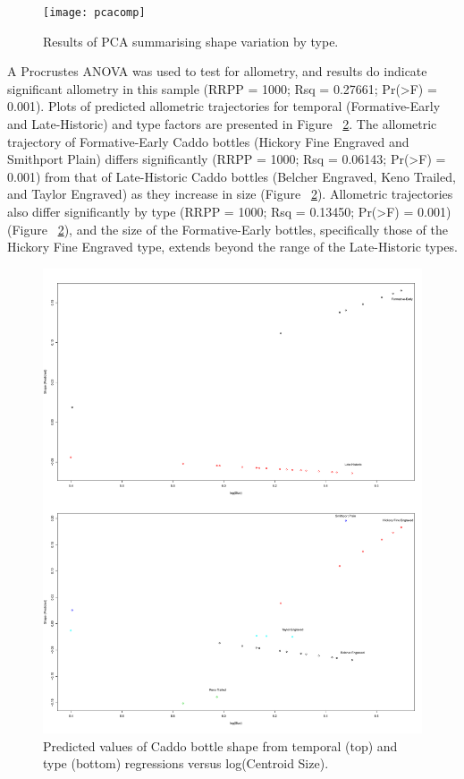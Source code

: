 \documentclass[review]{elsarticle}
\begin{document}
\begin{figure}[htbp]\centering
\texttt{[image: pcacomp]}
\caption{Results of PCA summarising shape variation by type.}
\label{fig:FigPCA}
\end{figure}

A Procrustes ANOVA was used to test for allometry, and results do indicate significant allometry in this sample (RRPP = 1000; Rsq = 0.27661; Pr(>F) = 0.001). Plots of predicted allometric trajectories for temporal (Formative-Early and Late-Historic) and type factors are presented in Figure ~\ref{fig:FigAllometry}. The allometric trajectory of Formative-Early Caddo bottles (Hickory Fine Engraved and Smithport Plain) differs significantly (RRPP = 1000; Rsq = 0.06143; Pr(>F) = 0.001) from that of Late-Historic Caddo bottles (Belcher Engraved, Keno Trailed, and Taylor Engraved) as they increase in size (Figure ~\ref{fig:FigAllometry}). Allometric trajectories also differ significantly by type (RRPP = 1000; Rsq = 0.13450; Pr(>F) = 0.001) (Figure ~\ref{fig:FigAllometry}), and the size of the Formative-Early bottles, specifically those of the Hickory Fine Engraved type, extends beyond the range of the Late-Historic types.

\begin{figure}[htbp]\centering
\includegraphics[width=\linewidth]{allometry}
\caption{Predicted values of Caddo bottle shape from temporal (top) and type (bottom) regressions versus log(Centroid Size).}
\label{fig:FigAllometry}
\end{figure}
\end{document}
